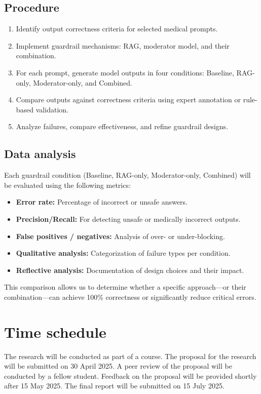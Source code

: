 \documentclass[a4paper,doc,natbib]{apa6}
\begin{document}
    \subsection{Procedure}

    \begin{enumerate}
        \item Identify output correctness criteria for selected medical prompts.
        \item Implement guardrail mechanisms: RAG, moderator model, and their combination.
        \item For each prompt, generate model outputs in four conditions: Baseline, RAG-only, Moderator-only, and Combined.
        \item Compare outputs against correctness criteria using expert annotation or rule-based validation.
        \item Analyze failures, compare effectiveness, and refine guardrail designs.
    \end{enumerate}

    \subsection{Data analysis}

    Each guardrail condition (Baseline, RAG-only, Moderator-only, Combined) will be evaluated using the following metrics:

    \begin{itemize}
        \item \textbf{Error rate:} Percentage of incorrect or unsafe answers.
        \item \textbf{Precision/Recall:} For detecting unsafe or medically incorrect outputs.
        \item \textbf{False positives / negatives:} Analysis of over- or under-blocking.
        \item \textbf{Qualitative analysis:} Categorization of failure types per condition.
        \item \textbf{Reflective analysis:} Documentation of design choices and their impact.
    \end{itemize}

    This comparison allows us to determine whether a specific approach—or their combination—can achieve 100\% correctness or significantly reduce critical errors.

    \section{Time schedule}

    The research will be conducted as part of a course. The proposal for the research will be submitted on 30 April 2025. A peer review of the proposal will be conducted by a fellow student. Feedback on the proposal will be provided shortly after 15 May 2025. The final report will be submitted on 15 July 2025.

    
\end{document}
